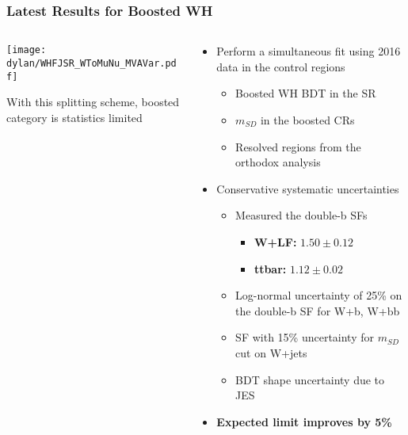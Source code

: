 \documentclass{beamer}
\begin{document}
\begin{frame}
  \frametitle{Latest Results for Boosted WH}
  \begin{columns}
    \begin{column}{0.4\linewidth}
      \hspace*{-0.1\linewidth}
      \texttt{[image: dylan/WHFJSR\_WToMuNu\_MVAVar.pdf]}

      {With this splitting scheme, boosted category is statistics limited}

    \end{column}
    \begin{column}{0.7\linewidth}
      \begin{itemize}
      \item Perform a simultaneous fit using 2016 data in the control regions
        \begin{itemize}
        \item Boosted WH BDT in the SR
        \item $m_{SD}$ in the boosted CRs
        \item Resolved regions from the orthodox analysis
        \end{itemize}
      \item Conservative systematic uncertainties
        \begin{itemize}
        \item Measured the double-b SFs
          \begin{itemize}
          \item {\bf W+LF:} $1.50 \pm 0.12$
          \item {\bf ttbar:} $1.12 \pm 0.02$
          \end{itemize}
        \item Log-normal uncertainty of 25\% on the double-b SF for W+b, W+bb
        \item SF with 15\% uncertainty for $m_{SD}$ cut on W+jets
        \item BDT shape uncertainty due to JES
        \end{itemize}
      \item {\bf Expected limit improves by 5\%}
      \end{itemize}
    \end{column}
  \end{columns}
\end{frame}
\end{document}
